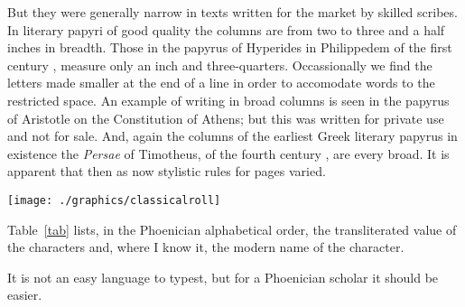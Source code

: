 \begin{multicols}{2}
But they were generally narrow in texts written for the market by skilled scribes. In literary papyri of good quality the columns are from two to three and a half inches in breadth. Those in the papyrus of Hyperides in Philippedem of the first century \BC, measure only an inch and three-quarters. Occassionally we find the letters made smaller at the end of a line in order to accomodate words to the restricted space. An example of writing in broad columns is seen in the papyrus of Aristotle on the Constitution of Athens; but this was written for private use and not for sale. And, again the columns of the earliest Greek literary papyrus in existence the  \textit{Persae} of Timotheus, of the fourth century \BC, are every broad. It is apparent that then as now stylistic rules for pages varied.





\begin{marginfigure}%
  \texttt{[image: ./graphics/classicalroll]}
  \label{fig:marginfig1}
\end{marginfigure}

\clearpage
\newcommand{\thisfont}{Phoenician}

    Table~\ref{tab} lists, in the \thisfont{} alphabetical order, the
 transliterated value of the characters and, where I know it, the
 modern name of the character.

It is not an easy language to typest, but for a Phoenician scholar it should be easier.



\end{multicols}
